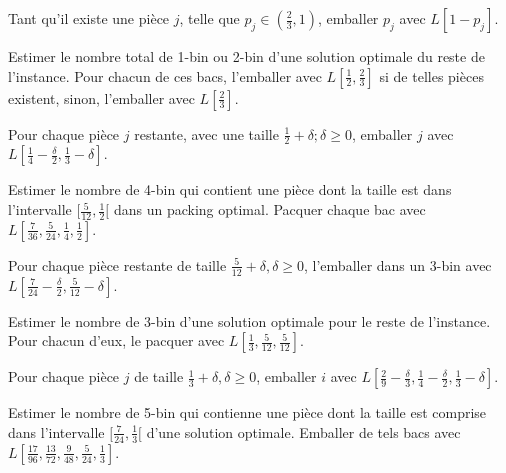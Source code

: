 \documentclass[a4paper,12pt]{report}
\theoremstyle{plain}				%
\theoremstyle{definition}				%
\begin{document}
\begin{algorithm}[H]
\DontPrintSemicolon

Tant qu'il existe une pièce $j$, telle que $p_j \in (\frac{2}{3},1)$,
emballer $p_j$ avec $L[1-p_j]$.

\BlankLine %
Estimer le nombre total de 1-bin ou 2-bin d'une solution optimale du
reste de l'instance.
Pour chacun de ces bacs, l'emballer avec $L[\frac{1}{2}, \frac{2}{3}]$
si de telles pièces existent, sinon, l'emballer avec $L[\frac{2}{3}]$.

\BlankLine %

\BlankLine %
Pour chaque pièce $j$ restante, avec une taille $\frac{1}{2}+\delta;
\delta \geq 0$, emballer $j$ avec $L[\frac{1}{4}-\frac{\delta}{2},
\frac{1}{3}-\delta]$.

\BlankLine %
Estimer le nombre de 4-bin qui contient une pièce dont la taille est
dans l'intervalle $[\frac{5}{12}, \frac{1}{2}[$ dans un packing
optimal. Pacquer chaque bac avec $L[ \frac{7}{36}, \frac{5}{24},
\frac{1}{4}, \frac{1}{2}]$.

Pour chaque pièce restante de taille
$\frac{5}{12}+\delta, \delta \geq 0$, l'emballer dans un 3-bin avec
$L[\frac{7}{24}-\frac{\delta}{2}, \frac{5}{12}-\delta]$.

\BlankLine %
Estimer le nombre de 3-bin d'une solution optimale pour le reste de
l'instance. Pour chacun d'eux, le pacquer avec $L[\frac{1}{3},
\frac{5}{12}, \frac{5}{12}]$.

\BlankLine %

Pour chaque pièce $j$ de taille $\frac{1}{3}+\delta, \delta \geq 0$,
emballer $i$
avec $L[\frac{2}{9}-\frac{\delta}{3},
        \frac{1}{4}-\frac{\delta}{2},
        \frac{1}{3}-\delta]$.

\BlankLine %
Estimer le nombre de 5-bin qui contienne une pièce
dont la taille est comprise dans l'intervalle
$[\frac{7}{24},\frac{1}{3}[$ d'une solution optimale.
Emballer de tels bacs avec
$L[\frac{17}{96},
   \frac{13}{72},
   \frac{9}{48},
   \frac{5}{24},
   \frac{1}{3}]$.


\end{algorithm}
\end{document}
